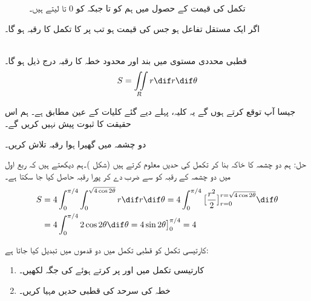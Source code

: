 \begin{figure}
\begin{minipage}{0.40\textwidth}
\caption{
تکمل کی قیمت کے حصول میں ہم  کو  تا  جبکہ  کو 0 تا  لیتے ہیں۔
}
\label{شکل_مثال_بالکثرت_دو_چشمہ}
\end{minipage}
\end{figure}

اگر  ایک مستقل تفاعل ہو جس کی قیمت  ہو  تب  پر  کا تکمل  کا رقبہ ہو گا۔

\\
قطبی محددی مستوی میں بند اور محدود خطہ  کا  رقبہ درج ذیل ہو گا۔
\begin{align}
S=\iint\limits_R r\dif r\dif\theta
\end{align}

جیسا آپ توقع کرتے ہوں گے یہ کلیہ، پہلے دیے گئے کلیات کے عین مطابق ہے۔ ہم اس حقیقت کا ثبوت پیش نہیں کریں گے۔

دو  چشمہ  میں گھیرا ہوا  رقبہ تلاش کریں۔

حل:\quad
ہم دو چشمہ کا خاکہ بنا کر تکمل کی حدیں معلوم کرتے ہیں (شکل )۔ہم دیکھتے ہیں کہ ربع اول میں دو چشمہ کے رقبہ کو  سے ضرب دے کر پورا رقبہ حاصل کیا جا سکتا ہے۔
\begin{align*}
S&=4\int_{0}^{\pi/4}\int_0^{\sqrt{4\cos2\theta}}r\dif r\dif \theta=4\int_0^{\pi/4}\big[\frac{r^2}{2}\big]_{r=0}^{r=\sqrt{4\cos2\theta}}\dif\theta\\
&=4\int_0^{\pi/4}2\cos2\theta\dif\theta=4\sin2\theta\big]_0^{\pi/4}=4
\end{align*}

کارتیسی تکمل  کو قطبی تکمل میں  دو قدموں میں تبدیل کیا جاتا ہے:
\begin{enumerate}[1.]
\item
کارتیسی تکمل میں   اور  پر کرتے ہوئے   کی جگہ  لکھیں۔
\item
خطہ  کی سرحد کی قطبی حدیں مہیا کریں۔
\end{enumerate}
 
